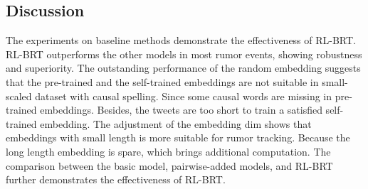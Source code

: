 \subsection{Discussion}
The experiments on baseline methods demonstrate the effectiveness of RL-BRT. RL-BRT outperforms the other models in most rumor events, showing robustness and superiority. The outstanding performance of the random embedding suggests that the pre-trained and the self-trained embeddings are not suitable in small-scaled dataset with causal spelling. Since some causal words are missing in pre-trained embeddings. Besides, the tweets are too short to train a satisfied self-trained embedding. The adjustment of the embedding dim shows that embeddings with small length is more suitable for rumor tracking. Because the long length embedding is spare, which brings additional computation. The comparison between the basic model, pairwise-added models, and RL-BRT further demonstrates the effectiveness of RL-BRT. 

